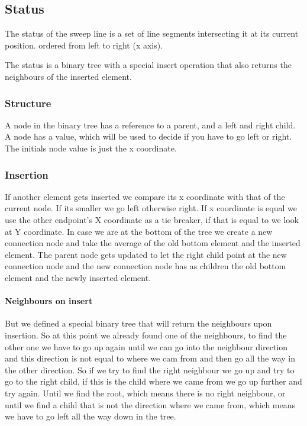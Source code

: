 \documentclass{article}
\begin{document}
\subsection{Status}
The status of the sweep line is a set of line segments intersecting it at
its current position. ordered from left to right (x axis).

The status is a binary tree with a special insert operation that also
returns the neighbours of the inserted element.

\subsubsection{Structure}
A node in the binary tree has a reference to a parent, and a left and right child.
A node has a value, which will be used to decide if you have to go left or right.
The initials node value is just the x coordinate.

\subsubsection{Insertion}
If another element gets
inserted we compare its x coordinate with that of the current node. If its
smaller we go left otherwise right. If x coordinate is equal we use the other
endpoint's X coordinate as a tie breaker, if that is equal to we look at
Y coordinate.
In case we are at the bottom of the tree we create a new connection node
and take the average of the old bottom element and the inserted element.
The parent node gets updated to let the right child point at the new
connection node and the new connection node has as children the old bottom
element and the newly inserted element.

\paragraph{Neighbours on insert}
But we defined a special binary tree that will return the neighbours upon
insertion. So at this point we already found one of the neighbours, to find
the other one we have to go up again until we can go into the neighbour
direction and this direction is not equal to where we cam from and then go
all the way in the other direction.
So if we try to find the right neighbour we go up and try to go to the right
child, if this is the child where we came from we go up further and try again.
Until we find the root, which means there is no right neighbour, or until
we find a child that is not the direction where we came from, which means
we have to go left all the way down in the tree.
\end{document}
